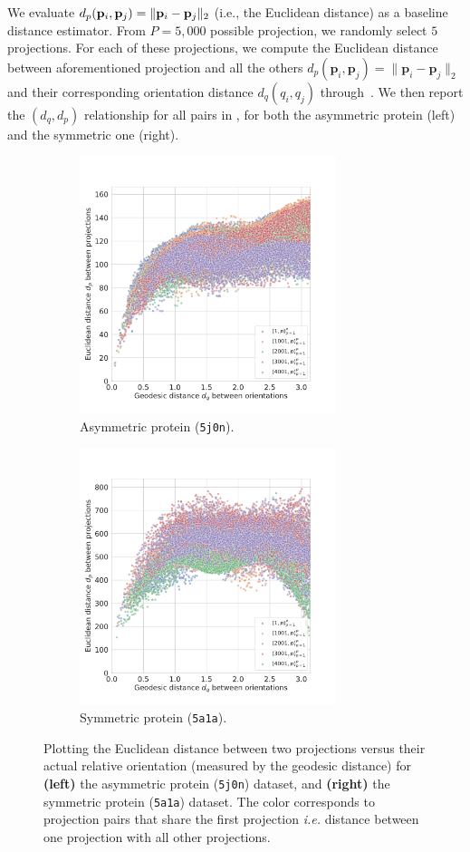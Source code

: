 We evaluate $d_p(\mathbf{p}_i, \mathbf{p}_j) = \Vert \mathbf{p}_i - \mathbf{p}_j \Vert_2$ (i.e., the Euclidean distance) as a baseline distance estimator.
From $P = 5,000$ possible projection, we randomly select $5$ projections.
For each of these projections, we compute the Euclidean distance between aforementioned projection and all the others $d_p(\mathbf{p}_i,\mathbf{p}_j)=\lVert\mathbf{p}_i-\mathbf{p}_j\rVert_2$ and their corresponding orientation distance $d_q(q_i,q_j)$ through~.
We then report the $(d_q,d_p)$ relationship for all pairs in , for both the asymmetric protein (left) and the symmetric one (right).

\begin{figure}[ht!]
    \centering
    \begin{subfigure}[t]{0.45\textwidth}
        \includegraphics[height=7.5cm]{figures/eucl_notrobust_5j0n}
        \caption{Asymmetric protein (\texttt{5j0n}).}
    \end{subfigure} \quad \quad
    \begin{subfigure}[t]{0.45\textwidth}
        \includegraphics[height=7.5cm]{figures/eucl_notrobust_5a1a}
        \caption{Symmetric protein (\texttt{5a1a}).}
    \end{subfigure}
    \caption{
        Plotting the Euclidean distance between two projections versus their actual relative orientation (measured by the geodesic distance) for \textbf{(left)} the asymmetric protein (\texttt{5j0n}) dataset, and \textbf{(right)} the symmetric protein (\texttt{5a1a}) dataset.
        The color corresponds to projection pairs that share the first projection \textit{i.e.} distance between one projection with all other projections.
    }\label{fig:euclidean-not-robust}
\end{figure}

